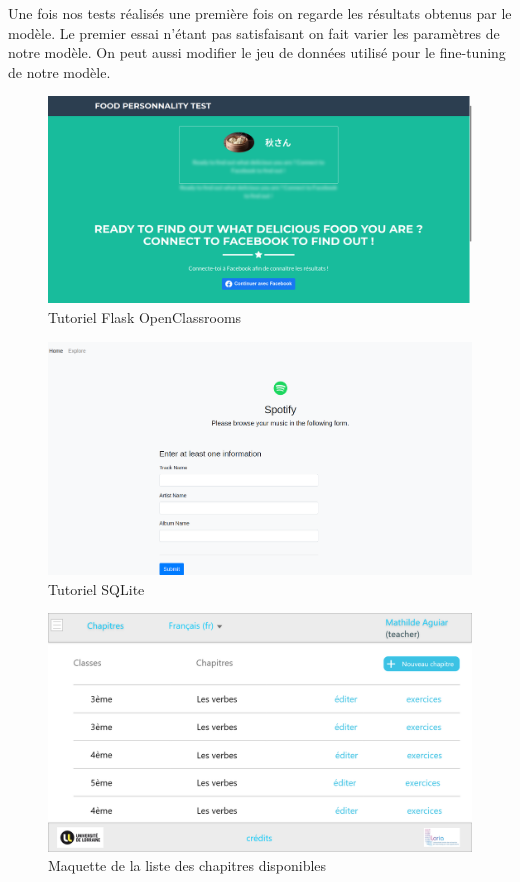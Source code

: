 \documentclass[12pt]{article}
\begin{document}
Une fois nos tests réalisés une première fois on regarde les résultats obtenus par le modèle. Le premier essai n'étant pas satisfaisant on fait varier les paramètres de notre modèle. On peut aussi modifier le jeu de données utilisé pour le fine-tuning de notre modèle. 

\newpage



\begin{figure}
    \centering
    \includegraphics[scale=0.27]{tuto_OC.png}
    \caption{Tutoriel Flask OpenClassrooms}
    \label{fig:tuto_OC}
\end{figure}

\begin{figure}
    \centering
    \includegraphics[scale=0.3]{tuto_sqlite.png}
    \caption{Tutoriel SQLite}
    \label{fig:tuto_sqlite}
\end{figure}

\begin{figure}
    \centering
    \includegraphics[scale=0.27]{Chapitres.png}
    \caption{Maquette de la liste des chapitres disponibles}
    \label{fig:maquette1}
\end{figure}
\end{document}
